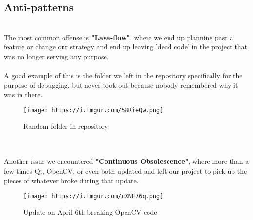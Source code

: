 \documentclass[12pt]{article}
\begin{document}
\subsection*{Anti-patterns}
\\The most common offense is \textbf{"Lava-flow"}, where we end up planning past a feature or change our strategy and end up leaving 'dead code' in the project that was no longer serving any purpose.
\\
\\A good example of this is the folder we left in the repository specifically for the purpose of debugging, but never took out because nobody remembered why it was in there.
\\\begin{figure}[h]
    \centering
    \texttt{[image: https://i.imgur.com/58RieQw.png]}
    \caption{Random folder in repository}
\end{figure}
\\
\\Another issue we encountered \textbf{"Continuous Obsolescence"}, where more than a few times Qt, OpenCV, or even both updated and left our project to pick up the pieces of whatever broke during that update.
\\\begin{figure}[width=0.25\textwidth]
    \centering
    \texttt{[image: https://i.imgur.com/cXNE76q.png]}
    \caption{Update on April 6th breaking OpenCV code}
\end{figure}
\pagebreak
\end{document}
